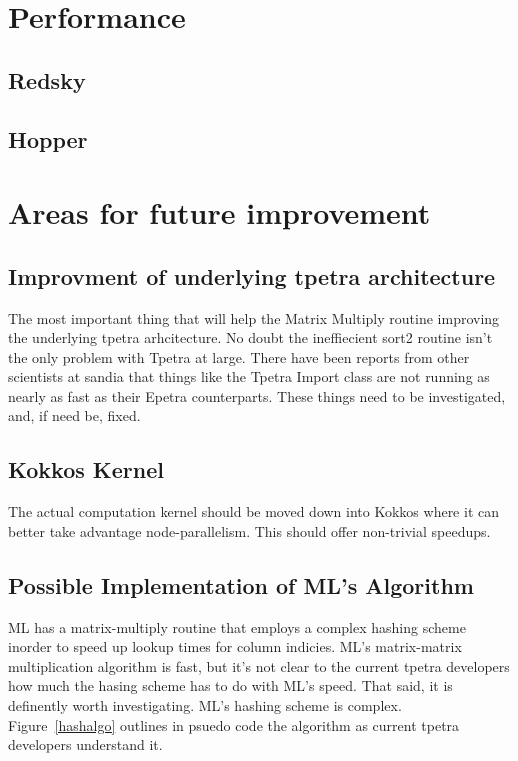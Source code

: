 \documentclass{article}
\begin{document}
\section{Performance}

\subsection{Redsky}

\subsection{Hopper}


\section{Areas for future improvement}
\subsection{Improvment of underlying tpetra architecture}
The most important thing that will help the Matrix Multiply routine improving the underlying tpetra arhcitecture. No doubt the ineffiecient sort2 routine 
isn't the only problem with Tpetra at large. There have been reports from other scientists at sandia that things like the Tpetra Import class are not 
running as nearly as fast as their Epetra counterparts. These things need to be investigated, and, if need be, fixed.

\subsection{Kokkos Kernel}
The actual computation kernel should be moved down into Kokkos where it can better take advantage node-parallelism. This should offer non-trivial speedups.

\subsection{Possible Implementation of ML's Algorithm}
ML has a matrix-multiply routine that employs a complex hashing scheme inorder to speed up lookup times for column indicies. ML's matrix-matrix
multiplication algorithm is fast, but it's not clear to the current tpetra developers how much the hasing scheme has to do with ML's speed. That said, it
is definently worth investigating. ML's hashing scheme is complex. Figure~\ref{hashalgo} outlines in psuedo code the algorithm as current tpetra developers 
understand it.
\end{document}
